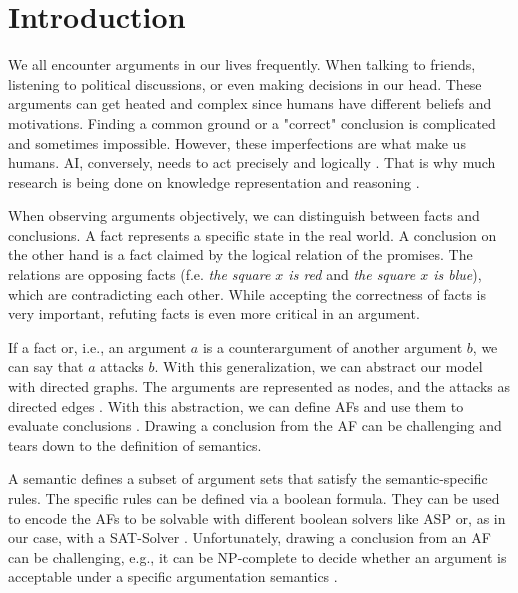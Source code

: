 \chapter{Introduction}
We all encounter arguments in our lives frequently. When talking to friends, listening to political discussions, or even making decisions in our head. These arguments can get heated and complex since humans have different beliefs and motivations. Finding a common ground or a "correct" conclusion is complicated and sometimes impossible. However, these imperfections are what make us humans. \ac{AI}, conversely, needs to act precisely and logically \cite{DBLP:journals/frai/DietzKM24}. That is why much research is being done on knowledge representation and reasoning \cite{DBLP:journals/dagstuhl-manifestos/DelgrandeG0TW24} \cite{DBLP:journals/inffus/PopescuD23}.

When observing arguments objectively, we can distinguish between facts and conclusions. A fact represents a specific state in the real world. A conclusion on the other hand is a fact claimed by the logical relation of the promises. The relations are opposing facts (f.e. \emph{the square $x$ is red} and \emph{the square $x$ is blue}), which are contradicting each other. While accepting the correctness of facts is very important, refuting facts is even more critical in an argument.

If a fact or, i.e., an argument $a$ is a counterargument of another argument $b$, we can say that $a$ attacks $b$. With this generalization, we can abstract our model with directed graphs. The arguments are represented as nodes, and the attacks as directed edges \cite{DUNG1995321}. With this abstraction, we can define \acp{AF} and use them to evaluate conclusions \cite{DBLP:conf/fapr/Geffner96}. Drawing a conclusion from the \ac{AF} can be challenging and tears down to the definition of semantics.

A semantic defines a subset of argument sets that satisfy the semantic-specific rules. The specific rules can be defined via a boolean formula. They can be used to encode the \acp{AF} to be solvable with different boolean solvers like \ac{ASP} \cite{DBLP:journals/corr/abs-1301-1388} or, as in our case, with a \ac{SAT-Solver} \cite{DBLP:journals/amai/AmgoudD13}. Unfortunately, drawing a conclusion from an AF can be challenging, e.g., it can be NP-complete to decide whether an argument is acceptable under a specific argumentation semantics \cite{DBLP:journals/ai/DvorakGRW23}.

